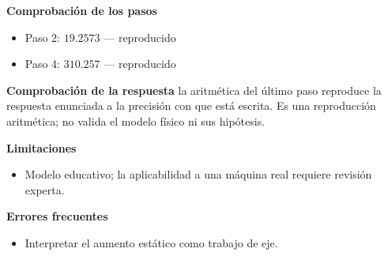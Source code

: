 \documentclass[10pt,openany]{book}
\begin{document}
\begin{tcolorbox}[title={Problema resuelto 2}, studiumworked, breakable]
\noindent\textbf{Comprobación de los pasos}
\begin{itemize}
\item Paso 2: $19.2573$ — reproducido
\item Paso 4: $310.257$ — reproducido
\end{itemize}

\noindent\textbf{Comprobación de la respuesta} la aritmética del último paso reproduce la respuesta enunciada a la precisión con que está escrita. Es una reproducción aritmética; no valida el modelo físico ni sus hipótesis.

\noindent\textbf{Limitaciones}
\begin{itemize}
\item Modelo educativo; la aplicabilidad a una máquina real requiere revisión experta.
\end{itemize}

\noindent\textbf{Errores frecuentes}
\begin{itemize}
\item Interpretar el aumento estático como trabajo de eje.
\end{itemize}
\end{tcolorbox}
\end{document}
